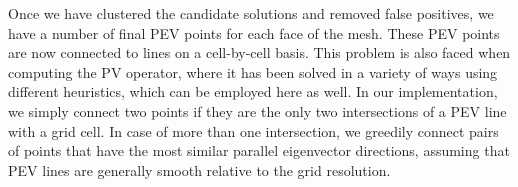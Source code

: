 %
Once we have clustered the candidate solutions and removed false positives, we
have a number of final \ac{PEV} points for each face of the mesh.
%
These \ac{PEV} points are now connected to lines on a cell-by-cell basis.
%
This problem is also faced when computing the \ac{PV} operator, where it has
been solved in a variety of ways using different heuristics, which can be
employed here as well.
%
In our implementation, we simply connect two points if they are the only
two intersections of a \ac{PEV} line with a grid cell.
%
In case of more than one intersection, we greedily connect pairs of points
that have the most similar parallel eigenvector directions, assuming that
\ac{PEV} lines are generally smooth relative to the grid resolution.
%
